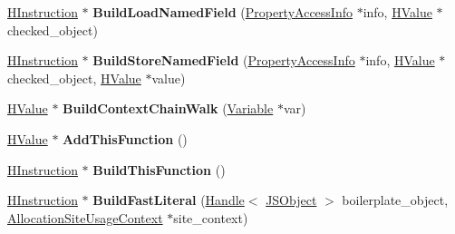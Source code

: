 \begin{DoxyCompactItemize}
\item 
\hyperlink{classv8_1_1internal_1_1_h_instruction}{H\+Instruction} $\ast$ {\bfseries Build\+Load\+Named\+Field} (\hyperlink{classv8_1_1internal_1_1_h_optimized_graph_builder_1_1_property_access_info}{Property\+Access\+Info} $\ast$info, \hyperlink{classv8_1_1internal_1_1_h_value}{H\+Value} $\ast$checked\+\_\+object)\hypertarget{classv8_1_1internal_1_1_h_optimized_graph_builder_ae4f1cba4b0ca28677214176eae8d2d23}{}\label{classv8_1_1internal_1_1_h_optimized_graph_builder_ae4f1cba4b0ca28677214176eae8d2d23}

\item 
\hyperlink{classv8_1_1internal_1_1_h_instruction}{H\+Instruction} $\ast$ {\bfseries Build\+Store\+Named\+Field} (\hyperlink{classv8_1_1internal_1_1_h_optimized_graph_builder_1_1_property_access_info}{Property\+Access\+Info} $\ast$info, \hyperlink{classv8_1_1internal_1_1_h_value}{H\+Value} $\ast$checked\+\_\+object, \hyperlink{classv8_1_1internal_1_1_h_value}{H\+Value} $\ast$value)\hypertarget{classv8_1_1internal_1_1_h_optimized_graph_builder_ab87530db7b80cd26b7092fe5fb1609f8}{}\label{classv8_1_1internal_1_1_h_optimized_graph_builder_ab87530db7b80cd26b7092fe5fb1609f8}

\item 
\hyperlink{classv8_1_1internal_1_1_h_value}{H\+Value} $\ast$ {\bfseries Build\+Context\+Chain\+Walk} (\hyperlink{classv8_1_1internal_1_1_variable}{Variable} $\ast$var)\hypertarget{classv8_1_1internal_1_1_h_optimized_graph_builder_a8fcedd7fc2ac9937b1a7135909ccf32a}{}\label{classv8_1_1internal_1_1_h_optimized_graph_builder_a8fcedd7fc2ac9937b1a7135909ccf32a}

\item 
\hyperlink{classv8_1_1internal_1_1_h_value}{H\+Value} $\ast$ {\bfseries Add\+This\+Function} ()\hypertarget{classv8_1_1internal_1_1_h_optimized_graph_builder_aa54a0c87337dc1af10a2b52bf3e922c4}{}\label{classv8_1_1internal_1_1_h_optimized_graph_builder_aa54a0c87337dc1af10a2b52bf3e922c4}

\item 
\hyperlink{classv8_1_1internal_1_1_h_instruction}{H\+Instruction} $\ast$ {\bfseries Build\+This\+Function} ()\hypertarget{classv8_1_1internal_1_1_h_optimized_graph_builder_ae686ee16a02d3d7e181d0207f979739c}{}\label{classv8_1_1internal_1_1_h_optimized_graph_builder_ae686ee16a02d3d7e181d0207f979739c}

\item 
\hyperlink{classv8_1_1internal_1_1_h_instruction}{H\+Instruction} $\ast$ {\bfseries Build\+Fast\+Literal} (\hyperlink{classv8_1_1internal_1_1_handle}{Handle}$<$ \hyperlink{classv8_1_1internal_1_1_j_s_object}{J\+S\+Object} $>$ boilerplate\+\_\+object, \hyperlink{classv8_1_1internal_1_1_allocation_site_usage_context}{Allocation\+Site\+Usage\+Context} $\ast$site\+\_\+context)\hypertarget{classv8_1_1internal_1_1_h_optimized_graph_builder_a0a5c1ff519a09b34d533271f4475f7c8}{}\label{classv8_1_1internal_1_1_h_optimized_graph_builder_a0a5c1ff519a09b34d533271f4475f7c8}


\end{DoxyCompactItemize}
